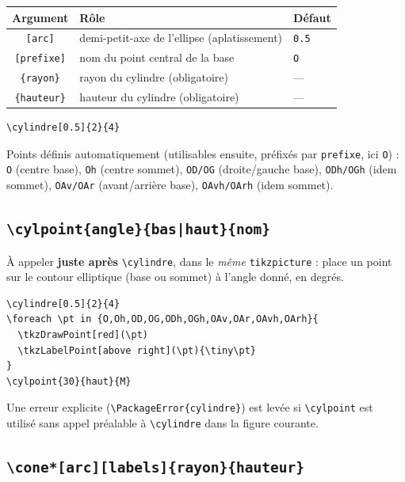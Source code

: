 \documentclass[11pt,a4paper]{article}
\newcommand{\cmdname}[1]{\texttt{\textbackslash#1}}
\begin{document}
\begin{center}
\begin{tabular}{@{}cll@{}}
\toprule
\textbf{Argument} & \textbf{Rôle} & \textbf{Défaut} \\
\midrule
\texttt{[arc]} & demi-petit-axe de l'ellipse (aplatissement) & \texttt{0.5} \\
\texttt{[prefixe]} & nom du point central de la base & \texttt{O} \\
\texttt{\{rayon\}} & rayon du cylindre (obligatoire) & --- \\
\texttt{\{hauteur\}} & hauteur du cylindre (obligatoire) & --- \\
\bottomrule
\end{tabular}
\end{center}

\begin{lstlisting}
\cylindre[0.5]{2}{4}
\end{lstlisting}

Points définis automatiquement (utilisables ensuite, préfixés par \texttt{prefixe}, ici \texttt{O}) : \texttt{O} (centre base), \texttt{Oh} (centre sommet), \texttt{OD/OG} (droite/gauche base), \texttt{ODh/OGh} (idem sommet), \texttt{OAv/OAr} (avant/arrière base), \texttt{OAvh/OArh} (idem sommet).

\subsection{\cmdname{cylpoint\{angle\}\{bas|haut\}\{nom\}}}

À appeler \textbf{juste après} \cmdname{cylindre}, dans le \emph{même} \texttt{tikzpicture} : place un point sur le contour elliptique (base ou sommet) à l'angle donné, en degrés.

\begin{lstlisting}
\cylindre[0.5]{2}{4}
\foreach \pt in {O,Oh,OD,OG,ODh,OGh,OAv,OAr,OAvh,OArh}{
  \tkzDrawPoint[red](\pt)
  \tkzLabelPoint[above right](\pt){\tiny\pt}
}
\cylpoint{30}{haut}{M}
\end{lstlisting}

\begin{avertissement}
Une erreur explicite (\texttt{\textbackslash PackageError\{cylindre\}}) est levée si \cmdname{cylpoint} est utilisé sans appel préalable à \cmdname{cylindre} dans la figure courante.
\end{avertissement}

\subsection{\cmdname{cone*[arc][labels]\{rayon\}\{hauteur\}}}
\end{document}
